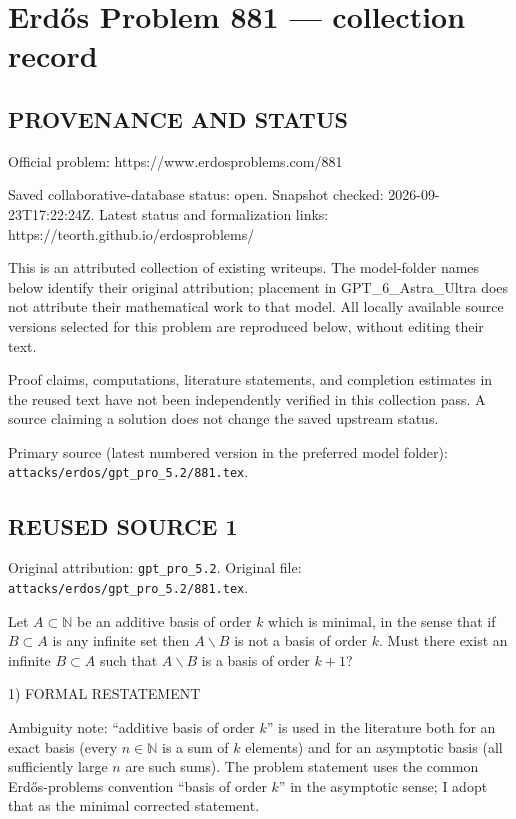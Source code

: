 \section*{Erd\H{o}s Problem 881 --- collection record}

\subsection*{PROVENANCE AND STATUS}
Official problem: https://www.erdosproblems.com/881

Saved collaborative-database status: open.
Snapshot checked: 2026-09-23T17:22:24Z.
Latest status and formalization links: https://teorth.github.io/erdosproblems/

This is an attributed collection of existing writeups. The model-folder names below identify their original attribution; placement in GPT\_6\_Astra\_Ultra does not attribute their mathematical work to that model. All locally available source versions selected for this problem are reproduced below, without editing their text.

Proof claims, computations, literature statements, and completion estimates in the reused text have not been independently verified in this collection pass. A source claiming a solution does not change the saved upstream status.

Primary source (latest numbered version in the preferred model folder): \texttt{attacks/erdos/gpt\_pro\_5.2/881.tex}.

\subsection*{REUSED SOURCE 1}
Original attribution: \texttt{gpt\_pro\_5.2}.
Original file: \texttt{attacks/erdos/gpt\_pro\_5.2/881.tex}.



Let $A\subset\mathbb{N}$ be an additive basis of order $k$ which is minimal, in the sense that if $B\subset A$ is any infinite set then $A\backslash B$ is not a basis of order $k$. Must there exist an infinite $B\subset A$ such that $A\backslash B$ is a basis of order $k+1$?

1) FORMAL RESTATEMENT

Ambiguity note: “additive basis of order $k$” is used in the literature both for an exact basis (every $n\in\mathbb N$ is a sum of $k$ elements) and for an asymptotic basis (all sufficiently large $n$ are such sums). The problem statement uses the common Erd\H{o}s-problems convention “basis of order $k$” in the asymptotic sense; I adopt that as the minimal corrected statement.

